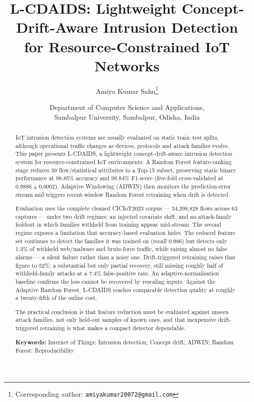 \documentclass[11pt,a4paper]{article}
\title{\textbf{L-CDAIDS: Lightweight Concept-Drift-Aware Intrusion
Detection for Resource-Constrained IoT Networks}}
\author{
  Amiya Kumar Sahu\thanks{Corresponding author: \texttt{amiyakumar20072@gmail.com}}
}
\date{Department of Computer Science and Applications,\\
Sambalpur University, Sambalpur, Odisha, India}
\begin{document}
\maketitle

\begin{abstract}
IoT intrusion detection systems are usually
evaluated on static train--test splits, although operational traffic changes as
devices, protocols and attack families evolve. This paper presents L-CDAIDS, a
lightweight concept-drift-aware intrusion detection system for
resource-constrained IoT environments. A Random Forest feature-ranking
stage reduces 39 flow/statistical attributes to a Top-15 subset, preserving
static binary performance at 98.85\% accuracy and 98.84\% F1-score (five-fold
cross-validated at $0.9886 \pm 0.0002$). Adaptive Windowing (ADWIN) then
monitors the prediction-error stream and triggers recent-window Random Forest
retraining when drift is detected.

Evaluation uses the complete cleaned CICIoT2023 corpus --- 34{,}298{,}828 flows
across 63 captures --- under two drift regimes: an injected covariate shift, and
an attack-family holdout in which families withheld from training appear
mid-stream. The second regime exposes a limitation that accuracy-based
evaluation hides. The reduced feature set continues to detect the families it
was trained on (recall 0.986) but detects only 1.3\% of withheld web/malware and
brute-force traffic, while raising almost no false alarms --- a silent failure
rather than a noisy one. Drift-triggered retraining raises that figure to 52\%:
a substantial but only partial recovery, still missing roughly half of
withheld-family attacks at a 7.4\% false-positive rate. An
adaptive-normalisation baseline confirms the loss cannot be recovered by
rescaling inputs. Against the Adaptive Random Forest, L-CDAIDS reaches
comparable detection quality at roughly a twenty-fifth of the online cost.

The practical conclusion is that feature reduction must be evaluated against
unseen attack families, not only held-out samples of known ones, and that
inexpensive drift-triggered retraining is what makes a compact detector
dependable.

\medskip
\noindent\textbf{Keywords:} Internet of Things; Intrusion detection;
Concept drift; ADWIN; Random Forest; Reproducibility
\end{abstract}

\end{document}
